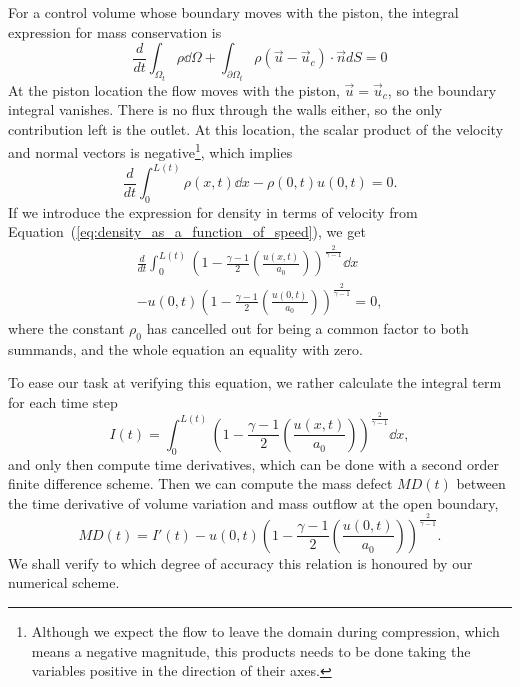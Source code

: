 \documentclass[../../thesis.tex]{subfiles}
\begin{document}
For a control volume whose boundary moves with the piston, 
the integral expression for mass conservation is
\begin{equation}
    \frac{d}{dt}\int_{\Omega_t} \rho \dd \Omega 
    + \int_{\partial\Omega_t} \rho \left(\vec{u} - \vec{u}_c\right) \cdot \vec{n} dS = 0
\end{equation}
At the piston location the flow moves with the piston, $\vec{u} = \vec{u}_c$, 
so the boundary integral vanishes. 
There is no flux through the walls either, so the only contribution left is the outlet.
At this location, the scalar product of the velocity and normal vectors is 
negative\footnote
{
    Although we expect the flow to leave the domain during compression, 
    which means a negative magnitude, this products needs to be done taking 
    the variables positive in the direction of their axes.
}, 
which implies
\begin{equation}
    \frac{d}{dt}\int_{0}^{L(t)} \rho(x,t) \dd x - \rho(0,t) u(0,t) = 0.
    \label{eq:integral_mass_conservation}
\end{equation}
If we introduce the expression for density in terms of velocity from 
Equation~(\ref{eq:density_as_a_function_of_speed}), we get
\begin{equation}
\begin{split}
        \frac{d}{dt}\int_{0}^{L(t)} \left(1 - \frac{\gamma-1}{2}\left(\frac{u(x,t)}{a_0}\right)\right)^{\frac{2}{\gamma-1}} \dd x 
        \\
        - u(0,t) \left(1 - \frac{\gamma-1}{2}\left(\frac{u(0,t)}{a_0}\right)\right)^{\frac{2}{\gamma-1}}  = 0,
\end{split}
\end{equation}
where the constant $\rho_0$ has cancelled out for being a common factor to both summands,
and the whole equation an equality with zero.

To ease our task at verifying this equation, we rather calculate the integral term for each time step
\begin{equation}
    I(t) = \int_{0}^{L(t)} \left(1 - \frac{\gamma-1}{2}\left(\frac{u(x,t)}{a_0}\right)\right)^{\frac{2}{\gamma-1}} \dd x,
\end{equation}
and only then compute time derivatives, which can be done with a second order finite difference scheme.
Then we can compute the mass defect $MD(t)$ between the time derivative of volume variation
and mass outflow at the open boundary,
\begin{equation}
    MD(t) = I'(t) - u(0,t) \left(1 - \frac{\gamma-1}{2}\left(\frac{u(0,t)}{a_0}\right)\right)^{\frac{2}{\gamma-1}}.
    \label{eq:mass_conservation_check}
\end{equation}
We shall verify to which degree of accuracy this relation is honoured by our numerical scheme.
\end{document}
